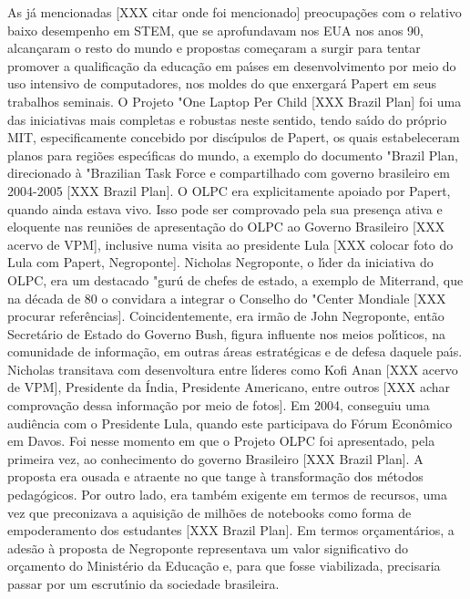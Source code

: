 \documentclass[
12pt,		%
openright,	%
twoside,  %
a4paper,			%
chapter=TITLE,		%
english,			%
french,				%
spanish,			%
brazil				%
]{USPSC-classe/USPSC}
\begin{document}
As j\'a mencionadas [XXX citar onde foi mencionado] preocupa\c{c}\~oes com o relativo baixo desempenho em STEM, que se aprofundavam nos EUA nos anos 90, alcan\c{c}aram o resto do mundo e propostas come\c{c}aram a surgir para tentar promover a qualifica\c{c}\~ao da educa\c{c}\~ao em pa\'{\i}ses em desenvolvimento por meio do uso intensivo de computadores, nos moldes do que enxergar\'a Papert em seus trabalhos seminais.
O Projeto "One Laptop Per Child [XXX Brazil Plan] foi uma das iniciativas mais completas e robustas neste sentido, tendo sa\'{\i}do  do pr\'oprio MIT, especificamente concebido por disc\'{\i}pulos de Papert, os quais estabeleceram planos para regi\~oes espec\'{\i}ficas do mundo, a exemplo do documento "Brazil Plan, direcionado \`a "Brazilian Task Force e compartilhado com governo brasileiro em 2004-2005 [XXX Brazil Plan]. O OLPC era explicitamente apoiado por Papert, quando ainda estava vivo. Isso pode ser comprovado pela sua presen\c{c}a ativa e eloquente nas reuni\~oes de apresenta\c{c}\~ao do OLPC ao Governo Brasileiro [XXX acervo de VPM], inclusive numa visita ao presidente Lula [XXX colocar foto do Lula com Papert, Negroponte].
Nicholas Negroponte, o l\'{\i}der da iniciativa do OLPC, era um destacado "gur\'u de chefes de estado, a exemplo de Miterrand, que na d\'ecada de 80 o convidara a integrar o Conselho do "Center Mondiale [XXX procurar refer\^encias]. Coincidentemente, era irm\~ao de John Negroponte, ent\~ao Secret\'ario de Estado do Governo Bush, figura influente nos meios pol\'{\i}ticos, na comunidade de informa\c{c}\~ao, em outras \'areas estrat\'egicas e de defesa daquele pa\'{\i}s. 
Nicholas transitava com desenvoltura entre l\'{\i}deres como Kofi Anan [XXX acervo de VPM], Presidente da \'India, Presidente Americano, entre outros [XXX achar comprova\c{c}\~ao dessa informa\c{c}\~ao por meio de fotos]. Em 2004, conseguiu uma audi\^encia com o Presidente Lula, quando este participava do F\'orum  Econ\^omico  em Davos. Foi nesse momento em que o Projeto OLPC foi apresentado, pela primeira vez, ao conhecimento do governo Brasileiro [XXX Brazil Plan].
A proposta era ousada e atraente no que tange \`a transforma\c{c}\~ao dos m\'etodos pedag\'ogicos. Por outro lado, era tamb\'em exigente em termos de recursos, uma vez que preconizava a aquisi\c{c}\~ao de milh\~oes de notebooks como forma de empoderamento dos estudantes [XXX Brazil Plan]. Em termos or\c{c}ament\'arios, a ades\~ao \`a proposta de Negroponte representava um valor significativo do or\c{c}amento do Minist\'erio da Educa\c{c}\~ao e, para que fosse viabilizada, precisaria passar por um escrut\'{\i}nio da sociedade brasileira.
\end{document}
